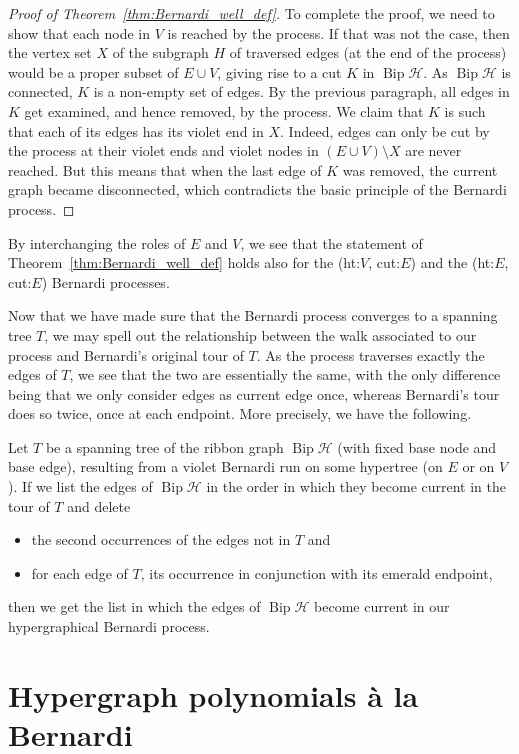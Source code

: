 \documentclass[ALCO,ThmDefs,Unicode,epreuves]{cedram}
\newcommand{\HH}{\mathcal H}
\DeclareMathOperator{\bip}{Bip}
\DeclareMathOperator{\Bip}{Bip}
\begin{document}
\begin{proof}[Proof of Theorem~\ref{thm:Bernardi_well_def}]
To complete the proof, we need to show that each node in $V$ is reached by the process. If that was not the case, then the vertex set $X$ of the subgraph $H$ of traversed edges (at the end of the process) would be a proper subset of $E\cup V$, giving rise to a cut $K$ in $\Bip\HH$. As $\bip\HH$ is connected, $K$ is a non-empty set of edges. By the previous paragraph, all edges in $K$ get examined, and hence removed, by the process. We claim that $K$ is such that each of its edges has its violet end in $X$. Indeed, edges can only be cut by the process at their violet ends and violet nodes in $(E\cup V)\setminus X$ are never reached. But this means that when the last edge of $K$ was removed, the current graph became disconnected, which contradicts the basic principle of the Bernardi process.
\end{proof}

By interchanging the roles of $E$ and $V$, we see that the statement of Theorem~\ref{thm:Bernardi_well_def} holds also for the (ht:$V$, cut:$E$) and the (ht:$E$, cut:$E$) Bernardi processes.

Now that we have made sure that the Bernardi process converges to a spanning tree $T$, we may spell out the relationship between the walk associated to our process and Bernardi's original tour of $T$. As the process traverses exactly the edges of $T$, we see that the two are essentially the same, with the only difference being that we only consider edges as current edge once, whereas Bernardi's tour does so twice, once at each endpoint.
More precisely, we have the following.

\begin{lemma}
\label{lem:walk_vs_tour}
Let $T$ be a spanning tree of the ribbon graph $\bip\HH$ (with fixed base node and base edge), resulting from a violet Bernardi run on some hypertree (on $E$ or on $V$). If we list the edges of $\bip\HH$ in the order in which they become current in the tour of $T$ and delete 
\begin{itemize}
\item the second occurrences of the edges not in $T$ and
\item for each edge of $T$, its occurrence in conjunction with its emerald endpoint,
\end{itemize}
then we get the list in which the edges of $\bip \HH$ become current in our hypergraphical Bernardi process. 
\end{lemma}



\section{Hypergraph polynomials \`a la Bernardi}
\label{sec:statements}
\end{document}
